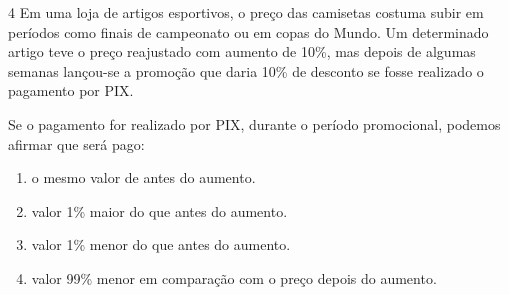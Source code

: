 \begin{escolha}
\begin{boxmedio}
\begin{boxmedio}
{\begin{boxpeq}
\begin{boxpeq}
{\begin{boxpeq}
\begin{boxmedio}
\begin{boxmedio}
\begin{boxpeq}
\begin{boxmedio}
\begin{boxpeq}
\begin{boxpeq}
\begin{boxpeq}
\begin{boxpeq}
\begin{boxmedio}
{\begin{boxmedio}
\begin{boxmedio}
\begin{boxpeq}
\begin{boxmedio}
\begin{boxpeq}
\begin{boxpeq}
\begin{boxpeq}
\begin{escolha}
{\begin{boxmedio}
\begin{boxpeq}
\begin{boxpeq}
\begin{boxpeq}
\begin{boxpeq}
\begin{boxpeq}
\begin{boxmedio}
\begin{boxpeq}
\begin{boxpeq}
\begin{boxpeq}
{\begin{boxpeq}
\begin{boxmedio}
\begin{boxpeq}
\begin{boxpeq}
\begin{boxpeq}
{\begin{boxpeq}
\begin{boxmedio}
{\begin{boxpeq}
\begin{boxpeq}
\begin{boxmedio}
\begin{boxmedio}
\begin{boxpeq}
\begin{boxpeq}
{\begin{boxpeq}
\begin{boxpeq}
\begin{boxpeq}
\begin{boxpeq}
\begin{boxpeq}
\begin{escolha}
\begin{escolha}
{\begin{boxmedio}
\begin{boxpeq}
\begin{q°}
\begin{boxmedio}
\begin{boxpeq}
\begin{boxpeq}
\begin{boxmedio}
\begin{boxmedio}
\begin{boxmedio}
\begin{boxmedio}
\num{4} Em uma loja de artigos esportivos, o preço das camisetas costuma 
subir em períodos como finais de campeonato ou em copas do Mundo. Um determinado
artigo teve o preço reajustado com aumento de 10\%, mas depois de algumas semanas
lançou-se a promoção que daria 10\% de desconto se fosse realizado o
pagamento por PIX.

Se o pagamento for realizado por PIX, durante o período promocional,
podemos afirmar que será pago:

\begin{enumerate}

\item o mesmo valor de antes do aumento.

\item valor 1\% maior do que antes do aumento.

\item valor 1\% menor do que antes do aumento.

\item valor 99\% menor em comparação com o preço depois do aumento.

\end{enumerate}

\end{boxmedio}
\end{boxmedio}
\end{boxmedio}
\end{boxmedio}
\end{boxpeq}
\end{boxpeq}
\end{boxmedio}
\end{q°}
\end{boxpeq}
\end{boxmedio}}
\end{escolha}
\end{escolha}
\end{boxpeq}
\end{boxpeq}
\end{boxpeq}
\end{boxpeq}
\end{boxpeq}}
\end{boxpeq}
\end{boxpeq}
\end{boxmedio}
\end{boxmedio}
\end{boxpeq}
\end{boxpeq}}
\end{boxmedio}
\end{boxpeq}}
\end{boxpeq}
\end{boxpeq}
\end{boxpeq}
\end{boxmedio}
\end{boxpeq}}
\end{boxpeq}
\end{boxpeq}
\end{boxpeq}
\end{boxmedio}
\end{boxpeq}
\end{boxpeq}
\end{boxpeq}
\end{boxpeq}
\end{boxpeq}
\end{boxmedio}}
\end{escolha}
\end{boxpeq}
\end{boxpeq}
\end{boxpeq}
\end{boxmedio}
\end{boxpeq}
\end{boxmedio}
\end{boxmedio}}
\end{boxmedio}
\end{boxpeq}
\end{boxpeq}
\end{boxpeq}
\end{boxpeq}
\end{boxmedio}
\end{boxpeq}
\end{boxmedio}
\end{boxmedio}
\end{boxpeq}}
\end{boxpeq}
\end{boxpeq}}
\end{boxmedio}
\end{boxmedio}
\end{escolha}
